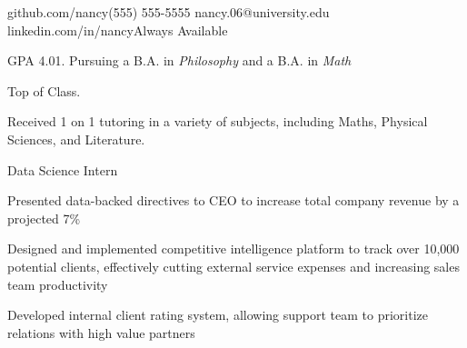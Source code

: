 \documentclass{practical-resume}
\begin{document}
\namehead

\address{nancy.com}{github.com/nancy}{(555) 555-5555}{ nancy.06@university.edu }{linkedin.com/in/nancy}{Always Available}


	\begin{position}{}{}
		\item GPA 4.01. Pursuing a B.A. in \textit{Philosophy} and a B.A. in \textit{Math}
		\item Top of Class.
	\end{position}

	\begin{position}{}{}
	\item Received 1 on 1 tutoring in a variety of subjects, including Maths, Physical Sciences, and Literature.
	\end{position}


	\begin{position}{Data Science Intern}{}
		\item Presented data-backed directives to CEO to increase total company revenue by a projected 7\%
		\item Designed and implemented competitive intelligence platform to track over 10,000 potential clients, effectively cutting external service expenses and increasing sales team productivity
		\item Developed internal client rating system, allowing support team to prioritize relations with high value partners
		
	\end{position}
	
\end{document}
